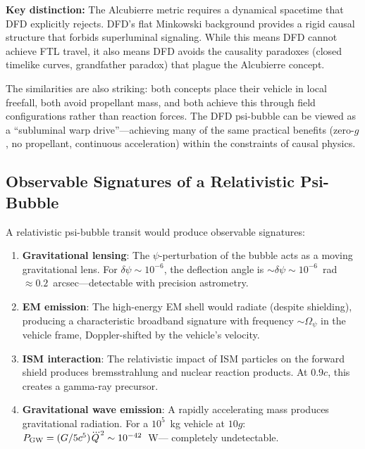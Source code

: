 \documentclass[aps,prd,twocolumn,superscriptaddress,nofootinbib]{revtex4-2}
\begin{document}
\textbf{Key distinction:} The Alcubierre metric requires a dynamical
spacetime that DFD explicitly rejects.  DFD's flat Minkowski
background provides a rigid causal structure that forbids
superluminal signaling.  While this means DFD cannot achieve FTL
travel, it also means DFD avoids the causality paradoxes (closed
timelike curves, grandfather paradox) that plague the Alcubierre
concept.

The similarities are also striking: both concepts place their
vehicle in local freefall, both avoid propellant mass, and both
achieve this through field configurations rather than reaction
forces.  The DFD psi-bubble can be viewed as a ``subluminal warp
drive''---achieving many of the same practical benefits (zero-$g$,
no propellant, continuous acceleration) within the constraints of
causal physics.

\subsection{Observable Signatures of a Relativistic Psi-Bubble}

A relativistic psi-bubble transit would produce observable signatures:
\begin{enumerate}
\item \textbf{Gravitational lensing}: The $\psi$-perturbation of the
bubble acts as a moving gravitational lens.  For $\delta\psi \sim 10^{-6}$,
the deflection angle is $\sim \delta\psi \sim 10^{-6}$~rad
$\approx 0.2$~arcsec---detectable with precision astrometry.

\item \textbf{EM emission}: The high-energy EM shell would radiate
(despite shielding), producing a characteristic broadband signature
with frequency $\sim \Omega_\psi$ in the vehicle frame, Doppler-shifted
by the vehicle's velocity.

\item \textbf{ISM interaction}: The relativistic impact of ISM
particles on the forward shield produces bremsstrahlung and nuclear
reaction products.  At $0.9c$, this creates a gamma-ray precursor.

\item \textbf{Gravitational wave emission}: A rapidly accelerating
mass produces gravitational radiation.  For a $10^5$~kg vehicle at
$10g$: $P_{\rm GW} = (G/5c^5)\dddot{Q}^2 \sim 10^{-42}$~W---
completely undetectable.
\end{enumerate}

\end{document}
